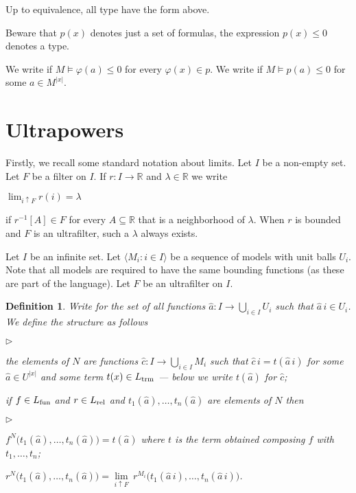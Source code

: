 \documentclass[12pt,letterpaper,oneside,reqno]{amsart}
\newcommand{\mylabel}[1]{{#1}\hfill}
\renewenvironment{itemize}
  {\begin{list}{$\triangleright$}{%
   \setlength{\parskip}{0mm}
   \setlength{\topsep}{.2\baselineskip}
   \setlength{\rightmargin}{0mm}
   \setlength{\listparindent}{0mm}
   \setlength{\itemindent}{0mm}
   \setlength{\labelwidth}{3ex}
   \setlength{\itemsep}{.2\baselineskip}
   \setlength{\parsep}{.2\baselineskip}
   \setlength{\partopsep}{0mm}
   \setlength{\labelsep}{1ex}
   \setlength{\leftmargin}{\labelwidth+\labelsep}
   \let\makelabel\mylabel}}{%
   \end{list}}
\theoremstyle{plain}
\newtheorem{definition}[theorem]{Definition}
\theoremstyle{remark}
\renewcommand*{\emph}[1]{%
   \smash{\tikz[baseline]\node[rectangle, fill=olive!25, rounded corners, inner xsep=0.5ex, inner ysep=0.2ex, anchor=base, minimum height = 2.7ex]{#1};}}
\begin{document}
Up to equivalence, all type have the form above.

Beware that $p(x)$ denotes just a set of formulas, the expression $p(x)\le0$ denotes a type.

We write \emph{$M\models p(a)\le0$} if $M\models\varphi(a)\le0$ for every $\varphi(x)\in p$.
We write \emph{$M\models \exists x\ p(x)\le0$} if $M\models p(a)\le0$ for some $a\in M^{|x|}$.


\section{Ultrapowers}\label{ultrapws}



Firstly, we recall some standard notation about limits.
Let $I$ be a non-empty set.
Let $F$ be a filter on $I$.
If $r:I\to{\mathds R}$ and $\lambda\in{\mathds R}$ we write

\hfil$\displaystyle \lim_{i\uparrow F}r(i)=\lambda$

if $r^{-1}[A]\in F$ for every $A\subseteq{\mathds R}$ that is a neighborhood of $\lambda$.
When $r$ is bounded and $F$ is an ultrafilter, such a $\lambda$ always exists.

Let $I$ be an infinite set.
Let $\langle M_i:i\in I\rangle$ be a sequence of models with unit balls $U_i$.
Note that all models are required to have the same bounding functions (as these are part of the language).
Let $F$ be an ultrafilter on $I$.

\begin{definition}\label{def_ultraproduct}
Write \emph{$U$\/} for the set of all functions $\hat a: I\to\bigcup_{i\in I}U_i$ such that $\hat a\,i\in U_i$.
We define the structure \emph{$N$\/} as follows
\begin{itemize}
  \item[1.] the elements of $N$ are functions $\hat c: I\to \bigcup_{i\in I}M_i$ such that $\hat c\,i = t(\hat a\,i)$ for some $\hat a\in U^{|x|}$ and some term $t(x)\in L_{\rm trm}$ --- below we write $t(\hat a)$ for $\hat c$;
  \item[2.] if $f\in L_{\rm fun}$ and $r\in L_{\rm rel}$ and $t_1(\hat a),\dots,t_n(\hat a)$ are elements of  $N$ then
  \begin{itemize}
    \item[a.] $f^{N}\big(t_1(\hat a),\dots,t_n(\hat a)\big)=t(\hat a)$ where $t$ is the term obtained composing $f$ with $t_1,\dots,t_n$;
    \item[b.] $r^{N}\big(t_1(\hat a),\dots,t_n(\hat a)\big)=\lim\limits_{i\uparrow F}\ r^{M_i}\big(t_1(\hat a\,i),\dots,t_n(\hat a\,i)\big)$. 
  \end{itemize}
\end{itemize}
\end{definition}
\end{document}

